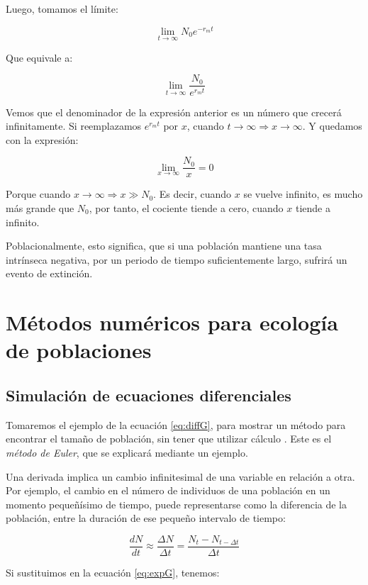 \documentclass[12pt,letterpaper,]{book}
\begin{document}
Luego, tomamos el límite:

\[
\lim_{t \to \infty}N_0 e^{-r_m t}
\]

Que equivale a:

\[
\lim_{t \to \infty}\frac{N_0}{e^{r_m t}}
\]

Vemos que el denominador de la expresión anterior es un número que
crecerá infinitamente. Si reemplazamos \(e^{r_m t}\) por \(x\), cuando
\(t \to \infty \Rightarrow x \to \infty\). Y quedamos con la expresión:

\[
\lim_{x \to \infty}\frac{N_0}{x} = 0
\]

Porque cuando \(x \to \infty \Rightarrow x \gg N_0\). Es decir, cuando
\(x\) se vuelve infinito, es mucho más grande que \(N_0\), por tanto, el
cociente tiende a cero, cuando \(x\) tiende a infinito.

Poblacionalmente, esto significa, que si una población mantiene una tasa
intrínseca negativa, por un periodo de tiempo suficientemente largo,
sufrirá un evento de extinción.

\begingroup
\small
\printindex
\vfill
\endgroup

\appendix


\chapter{Métodos numéricos para ecología de
poblaciones}\label{metodos-numericos-para-ecologia-de-poblaciones}

\section{Simulación de ecuaciones
diferenciales}\label{simulacion-de-ecuaciones-diferenciales}

Tomaremos el ejemplo de la ecuación \eqref{eq:diffG}, para mostrar un
método para encontrar el tamaño de población, sin tener que utilizar
cálculo \citep{Barrantes2015}. Este es el \emph{método de Euler}, que se
explicará mediante un ejemplo.

Una derivada implica un cambio infinitesimal de una variable en relación
a otra. Por ejemplo, el cambio en el número de individuos de una
población en un momento pequeñísimo de tiempo, puede representarse como
la diferencia de la población, entre la duración de ese pequeño
intervalo de tiempo:

\[
\frac{dN}{dt} \approx \frac{\Delta N}{\Delta t} = \frac{N_t - N_{t-\Delta t}}{\Delta t}
\]

Si sustituimos en la ecuación \eqref{eq:expG}, tenemos:
\end{document}

